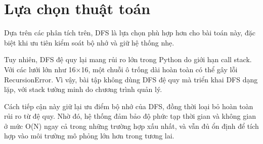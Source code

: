 \section{Lựa chọn thuật toán}

Dựa trên các phân tích trên, DFS là lựa chọn phù hợp hơn cho bài toán này, đặc biệt khi ưu tiên kiểm soát bộ nhớ và giữ hệ thống nhẹ.

Tuy nhiên, DFS đệ quy lại mang rủi ro lớn trong Python do giới hạn call stack. Với các lưới lớn như 16×16, một chuỗi ô trống dài hoàn toàn có thể gây lỗi RecursionError. Vì vậy, bài tập không dùng DFS đệ quy mà triển khai DFS dạng lặp, với stack tường minh do chương trình quản lý.

Cách tiếp cận này giữ lại ưu điểm bộ nhớ của DFS, đồng thời loại bỏ hoàn toàn rủi ro từ đệ quy. Nhờ đó, hệ thống đảm bảo độ phức tạp thời gian và không gian ở mức O(N) ngay cả trong những trường hợp xấu nhất, và vẫn đủ ổn định để tích hợp vào môi trường mô phỏng lớn hơn trong tương lai.